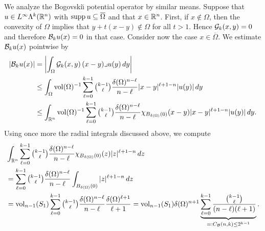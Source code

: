\documentclass[10pt,a4paper]{article}
\begin{document}
We analyze the Bogovski\u{\i} potential operator by similar means. 
Suppose that $u \in L^{\infty}\Lambda^{k}({\mathbb R}^{n})$ with $\operatorname{supp} u \subseteq \overline\Omega$ and that $x \in {\mathbb R}^{n}$.
First, if $x \notin \Omega$, then the convexity of $\Omega$ implies that $y + t( x - y ) \notin \Omega$ for all $t > 1$. Hence ${\mathcal G}_{k}(x,y) = 0$ and therefore ${\mathcal B}_{k} u(x) = 0$ in that case.
Consider now the case $x \in \overline\Omega$. 
We estimate ${\mathcal B}_{k} u(x)$ pointwise by 
\begin{align*}
    \left| {\mathcal B}_{k} u(x) \right|
    &=
    \left| 
        \int_{\Omega} {\mathcal G}_{k}(x,y) \,(x-y)\lrcorner u(y)\,dy
    \right| 
    \\&\leq 
    \int_{\Omega} \operatorname{vol}(\Omega)^{-1} \sum_{\ell=0}^{k-1}\tbinom{k-1}{\ell} \frac{ {\delta}(\Omega)^{n-\ell} }{n-\ell} |x-y|^{\ell+1-n} |u(y)| \,dy
    \\&\leq 
    \int_{{\mathbb R}^{n}} \operatorname{vol}(\Omega)^{-1} \sum_{\ell=0}^{k-1}\tbinom{k-1}{\ell} \frac{ {\delta}(\Omega)^{n-\ell} }{n-\ell} \chi_{B_{{\delta}(\Omega)}(0)}(x-y) |x-y|^{\ell+1-n} |u(y)| \,dy
    .
\end{align*}
Using once more the radial integrals discussed above, we compute 
\begin{align*}
    &
    \int_{{\mathbb R}^{n}} \sum_{\ell=0}^{k-1} \tbinom{k-1}{\ell} \frac{ {\delta}(\Omega)^{n-\ell} }{n-\ell} \chi_{B_{{\delta}(\Omega)}(0)}(z) |z|^{\ell+1-n} \,dz
    \\&
    =
    \sum_{\ell=0}^{k-1} \tbinom{k-1}{\ell} \frac{ {\delta}(\Omega)^{n-\ell} }{n-\ell} \int_{B_{{\delta}(\Omega)}(0)} |z|^{\ell+1-n} \,dz
    \\&
    =
    \operatorname{vol}_{n-1}(S_1) \sum_{\ell=0}^{k-1} \tbinom{k-1}{\ell} \frac{ {\delta}(\Omega)^{n-\ell} }{n-\ell} \frac{{\delta}(\Omega)^{\ell+1}}{\ell+1}
    =
    \operatorname{vol}_{n-1}(S_1) {\delta}(\Omega)^{n+1} \underbrace{ \sum_{\ell=0}^{k-1} \frac{ \tbinom{k-1}{\ell} }{ (n-\ell)(\ell+1) } }_{ =: C_{{\mathcal B}}(n,k) \leq 2^{k-1}}
    .
\end{align*}
\end{document}
